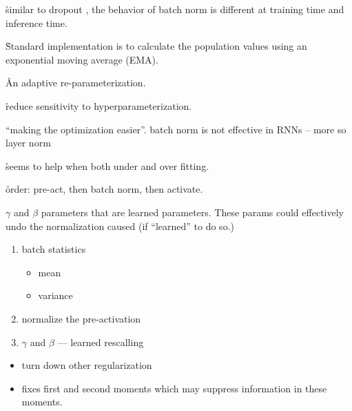 
\r{similar to dropout \ALR, the behavior of batch norm is different at training time and inference time.}

\r{Standard implementation is to calculate the population values using an exponential moving average (EMA).}



\r{An adaptive re-parameterization.}

\r{reduce sensitivity to hyperparameterization.}


\r{``making the optimization easier''. batch norm is not effective in RNNs -- more so layer norm}

\r{seems to help when both under and over fitting.}

\r{order: pre-act, then batch norm, then activate.}

\r{$\gamma$ and $\beta$ parameters that are learned parameters. These params could effectively undo the normalization caused (if ``learned'' to do so.)}

\begin{enumerate}[noitemsep,topsep=0pt]
	\item batch statistics
	\begin{itemize}[noitemsep,topsep=0pt]
		\item mean
		\item variance
	\end{itemize}
	\item normalize the pre-activation
	\item $\gamma$ and $\beta$ --- learned rescalling
\end{enumerate}


\begin{itemize}[noitemsep,topsep=0pt]
	\item turn down other regularization
	\item fixes first and second moments which may suppress information in these moments.
\end{itemize}

